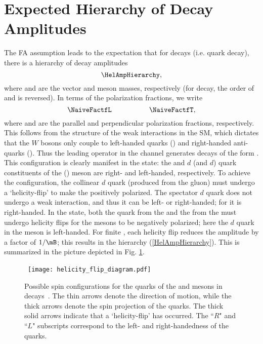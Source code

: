 \section{Expected Hierarchy of Decay Amplitudes}
The FA assumption leads to the expectation that for \Bvv decays (i.e. \bqbar quark decay), there is a hierarchy of decay amplitudes
\begin{equation}\label{HelAmpHierarchy}
\HelAmpHierarchy,
\end{equation}
where \mV and \mB are the vector and \B meson masses, respectively (for \Bbar decay, the order of \Ap and \Am is reversed). In terms of the polarization fractions, we write
\begin{equation}\label{HelAmpHierarchy2}
\NaiveFactfL~~~~~~~~~~~~~~~~\NaiveFactfT, 
\end{equation}
where \fPar and \fPerp are the parallel and perpendicular polarization fractions, respectively. This follows from the \VmA structure of the weak interactions in the SM, which dictates that the $W$ bosons only couple to left-handed quarks (\qL) and right-handed anti-quarks (\qbarR). Thus the leading operator in the \BzToOmeKstz channel generates decays of the form \bbarTosbarRdLdbarR. This configuration is clearly manifest in the \Az state: the \sqbar and $d$ (\dqbar and $d$) quark constituents of the \Kstz (\Ome) meson are right- and left-handed, respectively. To achieve the \Ap configuration, the collinear $d$ quark (produced from the gluon) must undergo a `helicity-flip' to make the \Kstz positively polarized.  The spectator $d$ quark does not undergo a weak interaction, and thus it can be left- or right-handed; for \Ap it is right-handed. In the \Am state, both the \sqbar quark from the \Kstz and the \dqbar from the \Ome must undergo helicity flips for the mesons to be negatively polarized; here the $d$ quark in the \Ome meson is left-handed. For finite \mB, each helicity flip reduces the amplitude by a factor of $1/\mB$; this results in the hierarchy (\ref{HelAmpHierarchy}). This is summarized in the picture depicted in Fig. \ref{helicity_flip_diagram}.

\begin{figure}[h]
\centerline{
\hbox{
\texttt{[image: helicity\_flip\_diagram.pdf]}\hspace{0.2cm} }}
\caption{Possible spin configurations for the quarks of the \Ome and \Kstz mesons in \BzToOmeKstz decays~\cite{gritsans_talk}. The thin arrows denote the direction of motion, while the thick arrows denote the spin projection of the quarks. The thick solid arrows indicate that a `helicity-flip' has occurred. The ``$R$" and ``$L$" subscripts correspond to the left- and right-handedness of the quarks.\label{helicity_flip_diagram}}
\vskip -0.2cm
\end{figure}



